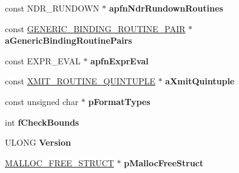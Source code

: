 \begin{DoxyCompactItemize}
\begin{tabbing}
\end{tabbing}\item 
\mbox{\label{struct___m_i_d_l___s_t_u_b___d_e_s_c_a27242f1f5dd3db2ea9458b3c15a0f49a}} 
const N\+D\+R\+\_\+\+R\+U\+N\+D\+O\+WN $\ast$ {\bfseries apfn\+Ndr\+Rundown\+Routines}
\item 
\mbox{\label{struct___m_i_d_l___s_t_u_b___d_e_s_c_ad1b292d31fefec456c1fdd69792d099d}} 
const \hyperlink{struct___g_e_n_e_r_i_c___b_i_n_d_i_n_g___r_o_u_t_i_n_e___p_a_i_r}{G\+E\+N\+E\+R\+I\+C\+\_\+\+B\+I\+N\+D\+I\+N\+G\+\_\+\+R\+O\+U\+T\+I\+N\+E\+\_\+\+P\+A\+IR} $\ast$ {\bfseries a\+Generic\+Binding\+Routine\+Pairs}
\item 
\mbox{\label{struct___m_i_d_l___s_t_u_b___d_e_s_c_aea6394d8c1ef7d45eb5e61716765a8ae}} 
const E\+X\+P\+R\+\_\+\+E\+V\+AL $\ast$ {\bfseries apfn\+Expr\+Eval}
\item 
\mbox{\label{struct___m_i_d_l___s_t_u_b___d_e_s_c_ace867a2b413eeb645accc06f5b53046f}} 
const \hyperlink{struct___x_m_i_t___r_o_u_t_i_n_e___q_u_i_n_t_u_p_l_e}{X\+M\+I\+T\+\_\+\+R\+O\+U\+T\+I\+N\+E\+\_\+\+Q\+U\+I\+N\+T\+U\+P\+LE} $\ast$ {\bfseries a\+Xmit\+Quintuple}
\item 
\mbox{\label{struct___m_i_d_l___s_t_u_b___d_e_s_c_a972c2527beaabfc6f442b2aef0b38b5a}} 
const unsigned char $\ast$ {\bfseries p\+Format\+Types}
\item 
\mbox{\label{struct___m_i_d_l___s_t_u_b___d_e_s_c_a23e218ae706955333b744aee63725586}} 
int {\bfseries f\+Check\+Bounds}
\item 
\mbox{\label{struct___m_i_d_l___s_t_u_b___d_e_s_c_a4c823eb3a98edf0158dced5081411db6}} 
U\+L\+O\+NG {\bfseries Version}
\item 
\mbox{\label{struct___m_i_d_l___s_t_u_b___d_e_s_c_a9326fb48d3dab6cb4caecaf6c3728069}} 
\hyperlink{struct___m_a_l_l_o_c___f_r_e_e___s_t_r_u_c_t}{M\+A\+L\+L\+O\+C\+\_\+\+F\+R\+E\+E\+\_\+\+S\+T\+R\+U\+CT} $\ast$ {\bfseries p\+Malloc\+Free\+Struct}

\end{DoxyCompactItemize}
